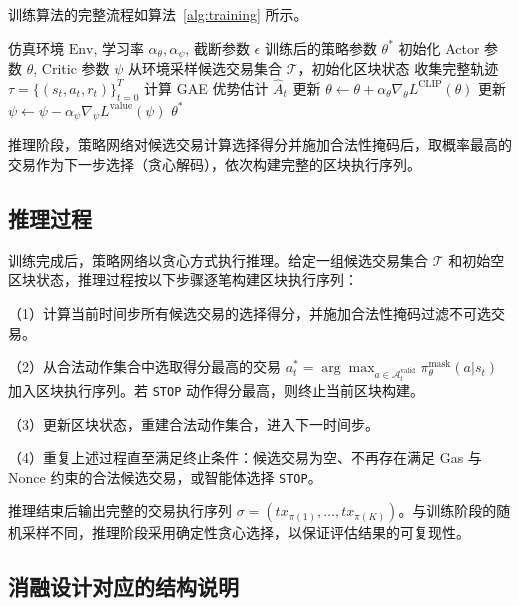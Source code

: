 训练算法的完整流程如算法~\ref{alg:training} 所示。

\begin{algorithm}[H]
\caption{基于 PPO 的交易排序策略训练}
\label{alg:training}
\begin{algorithmic}[1]
\REQUIRE 仿真环境 $\text{Env}$, 学习率 $\alpha_\theta, \alpha_\psi$, 截断参数 $\epsilon$
\ENSURE 训练后的策略参数 $\theta^*$
\STATE 初始化 Actor 参数 $\theta$, Critic 参数 $\psi$
    \STATE 从环境采样候选交易集合 $\mathcal{T}$，初始化区块状态
    \STATE 收集完整轨迹 $\tau = \{(s_t, a_t, r_t)\}_{t=0}^{T}$
    \STATE 计算 GAE 优势估计 $\hat{A}_t$
        \STATE 更新 $\theta \leftarrow \theta + \alpha_\theta \nabla_\theta L^{\text{CLIP}}(\theta)$
        \STATE 更新 $\psi \leftarrow \psi - \alpha_\psi \nabla_\psi L^{\text{value}}(\psi)$
    \ENDFOR
\ENDFOR
\RETURN $\theta^*$
\end{algorithmic}
\end{algorithm}

推理阶段，策略网络对候选交易计算选择得分并施加合法性掩码后，取概率最高的交易作为下一步选择（贪心解码），依次构建完整的区块执行序列。

\subsection{推理过程}

训练完成后，策略网络以贪心方式执行推理。给定一组候选交易集合 $\mathcal{T}$ 和初始空区块状态，推理过程按以下步骤逐笔构建区块执行序列：

（1）计算当前时间步所有候选交易的选择得分，并施加合法性掩码过滤不可选交易。

（2）从合法动作集合中选取得分最高的交易 $a_t^* = \arg\max_{a \in \mathcal{A}_t^{\text{valid}}} \pi_\theta^{\text{mask}}(a|s_t)$ 加入区块执行序列。若 \texttt{STOP} 动作得分最高，则终止当前区块构建。

（3）更新区块状态，重建合法动作集合，进入下一时间步。

（4）重复上述过程直至满足终止条件：候选交易为空、不再存在满足 Gas 与 Nonce 约束的合法候选交易，或智能体选择 \texttt{STOP}。

推理结束后输出完整的交易执行序列 $\sigma = (tx_{\pi(1)}, \ldots, tx_{\pi(K)})$。与训练阶段的随机采样不同，推理阶段采用确定性贪心选择，以保证评估结果的可复现性。

\subsection{消融设计对应的结构说明}


